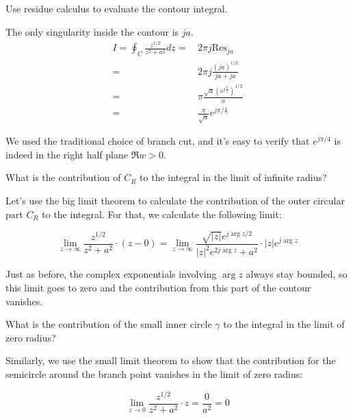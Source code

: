 \begin{cue}
Use residue calculus to evaluate the contour integral.
\end{cue}

\noindent{}The only singularity inside the contour is $ja$.
\begin{align}
I = \oint_{{C}} \frac{z^{1/2}}{z^2+a^2} dz =& \, 2 \pi j \textrm{Res}_{j a}
\nonumber \\
=& \, 2 \pi j \frac{(j a)^{1/2}}{ja + ja} \nonumber \\
=& \, \pi \frac{\sqrt{a}\left(e^{j\frac{\pi}{2}}\right)^{1/2}}{a} \nonumber \\
=& \, \frac{\pi}{\sqrt{a}} e^{j \pi /4}
\end{align}

We used the traditional choice of branch cut, and it's easy to verify that $e^{j \pi /4}$ is indeed in the right half plane $\Re w > 0$.

\begin{cue}
What is the contribution of ${C_R}$ to the integral in the limit of infinite radius?
\end{cue}

\noindent{}Let's use the big limit theorem to calculate the contribution of the outer circular part ${C_R}$ to the integral. For that, we calculate the following limit:

\begin{equation}
\lim_{z \to \infty}\frac{z^{1/2}}{z^2+a^2} \cdot (z - 0) = \lim_{z \to
\infty}\frac{\sqrt{|z|}e^{j \arg z / 2}}{|z|^2 e^{2 j \arg z}+a^2} \cdot |z|
e^{j \arg z}
\end{equation}

Just as before, the complex exponentials involving $\arg z$ always stay bounded, so this limit goes to zero and the contribution from this part of the contour vanishes.

\begin{cue}
What is the contribution of the small inner circle $\gamma$ to the integral in the limit of zero radius?
\end{cue}

Similarly, we use the small limit theorem to show that the contribution for the semicircle around the branch point vanishes in the limit of zero radius:

\begin{equation}
\lim_{z \to 0}\frac{z^{1/2}}{z^2+a^2} \cdot z = \frac{0}{a^2} = 0
\end{equation}

